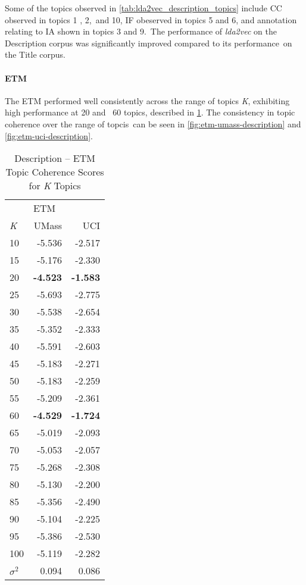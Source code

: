 \documentclass[letterpaper,12pt]{article}
\begin{document}
Some of the topics observed in \ref{tab:lda2vec_description_topics} include CC observed in topics 1 , 2,\
and 10, IF obeserved in topics 5 and 6, and annotation relating to IA shown in topics 3 and 9.\
The performance of \emph{lda2vec} on the Description corpus was significantly improved compared to its performance\
on the Title corpus.

\newpage
\paragraph{ETM}
The ETM performed well consistently across the range of topics \emph{K}, exhibiting high performance at 20 and \
60 topics, described in \ref{tab:etm_description_tc}. The consistency in topic coherence over the range of topcis\
can be seen in \ref{fig:etm-umass-description} and \ref{fig:etm-uci-description}.

\begin{table}
	\caption{\label{tab:etm_description_tc} Description -- ETM Topic Coherence Scores for \emph{K} Topics}
	\begin{center}
		\begin{tabular}{lrr}
			\toprule
			{} & \multicolumn{2}{l}{ETM} \\
			\emph{K} &  UMass &    UCI \\
			\midrule
			10  & -5.536 & -2.517 \\
			15  & -5.176 & -2.330 \\
			20  & \textbf{-4.523} & \textbf{-1.583} \\
			25  & -5.693 & -2.775 \\
			30  & -5.538 & -2.654 \\
			35  & -5.352 & -2.333 \\
			40  & -5.591 & -2.603 \\
			45  & -5.183 & -2.271 \\
			50  & -5.183 & -2.259 \\
			55  & -5.209 & -2.361 \\
			60  & \textbf{-4.529} & \textbf{-1.724} \\
			65  & -5.019 & -2.093 \\
			70  & -5.053 & -2.057 \\
			75  & -5.268 & -2.308 \\
			80  & -5.130 & -2.200 \\
			85  & -5.356 & -2.490 \\
			90  & -5.104 & -2.225 \\
			95  & -5.386 & -2.530 \\
			100 & -5.119 & -2.282 \\
			\midrule
			$\sigma^2$ & 0.094 & 0.086 \\
			\bottomrule
			\end{tabular}
	\end{center}
\end{table}
\end{document}
